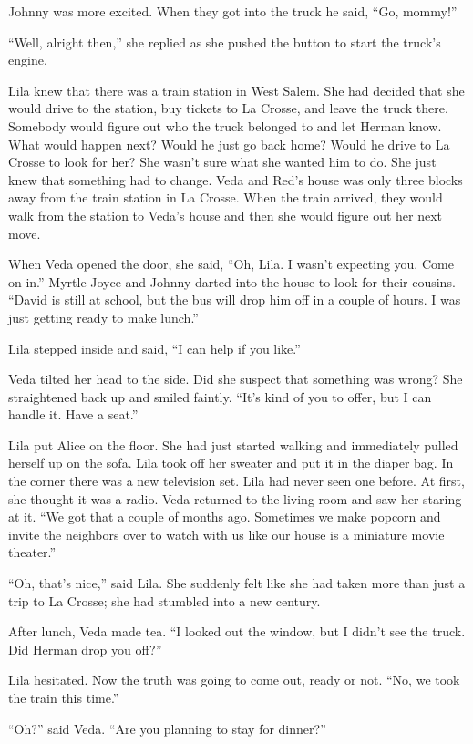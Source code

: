 \documentclass[
  letterpaper,
]{book}
\begin{document}
Johnny was more excited. When they got into the truck he said, ``Go,
mommy!''

``Well, alright then,'' she replied as she pushed the button to start
the truck's engine.

Lila knew that there was a train station in West Salem. She had decided
that she would drive to the station, buy tickets to La Crosse, and leave
the truck there. Somebody would figure out who the truck belonged to and
let Herman know. What would happen next? Would he just go back home?
Would he drive to La Crosse to look for her? She wasn't sure what she
wanted him to do. She just knew that something had to change. Veda and
Red's house was only three blocks away from the train station in La
Crosse. When the train arrived, they would walk from the station to
Veda's house and then she would figure out her next move.

When Veda opened the door, she said, ``Oh, Lila. I wasn't expecting you.
Come on in.'' Myrtle Joyce and Johnny darted into the house to look for
their cousins. ``David is still at school, but the bus will drop him off
in a couple of hours. I was just getting ready to make lunch.''

Lila stepped inside and said, ``I can help if you like.''

Veda tilted her head to the side. Did she suspect that something was
wrong? She straightened back up and smiled faintly. ``It's kind of you
to offer, but I can handle it. Have a seat.''

Lila put Alice on the floor. She had just started walking and
immediately pulled herself up on the sofa. Lila took off her sweater and
put it in the diaper bag. In the corner there was a new television set.
Lila had never seen one before. At first, she thought it was a radio.
Veda returned to the living room and saw her staring at it. ``We got
that a couple of months ago. Sometimes we make popcorn and invite the
neighbors over to watch with us like our house is a miniature movie
theater.''

``Oh, that's nice,'' said Lila. She suddenly felt like she had taken
more than just a trip to La Crosse; she had stumbled into a new century.

After lunch, Veda made tea. ``I looked out the window, but I didn't see
the truck. Did Herman drop you off?''

Lila hesitated. Now the truth was going to come out, ready or not. ``No,
we took the train this time.''

``Oh?'' said Veda. ``Are you planning to stay for dinner?''
\end{document}
